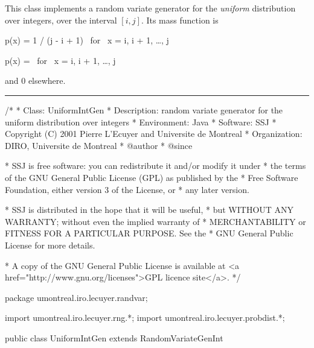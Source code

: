 
This class implements a random variate generator for the 
{\em uniform\/} distribution over integers, over the interval $[i,j]$.
Its mass function is
\begin{htmlonly}
\eq
   p(x) = 1 / (j - i + 1)  \qquad\mbox{ for } x = i, i + 1, \ldots, j
\endeq
\end{htmlonly}%
\begin{latexonly}
\eq
   p(x) =   \qquad\mbox{ for } x = i, i + 1, \ldots, j
\endeq
\end{latexonly}
and 0 elsewhere.

\bigskip\hrule

\begin{code}
\begin{hide}
/*
 * Class:        UniformIntGen
 * Description:  random variate generator for the uniform distribution over integers
 * Environment:  Java
 * Software:     SSJ 
 * Copyright (C) 2001  Pierre L'Ecuyer and Universite de Montreal
 * Organization: DIRO, Universite de Montreal
 * @author       
 * @since

 * SSJ is free software: you can redistribute it and/or modify it under
 * the terms of the GNU General Public License (GPL) as published by the
 * Free Software Foundation, either version 3 of the License, or
 * any later version.

 * SSJ is distributed in the hope that it will be useful,
 * but WITHOUT ANY WARRANTY; without even the implied warranty of
 * MERCHANTABILITY or FITNESS FOR A PARTICULAR PURPOSE.  See the
 * GNU General Public License for more details.

 * A copy of the GNU General Public License is available at
   <a href="http://www.gnu.org/licenses">GPL licence site</a>.
 */
\end{hide}
package umontreal.iro.lecuyer.randvar;\begin{hide}
import umontreal.iro.lecuyer.rng.*;
import umontreal.iro.lecuyer.probdist.*;
\end{hide}

public class UniformIntGen extends RandomVariateGenInt \begin{hide} {
   protected int left;     // the left limit of the interval
   protected int right;    // the right limit of the interval
    
\end{hide}
\end{code}

